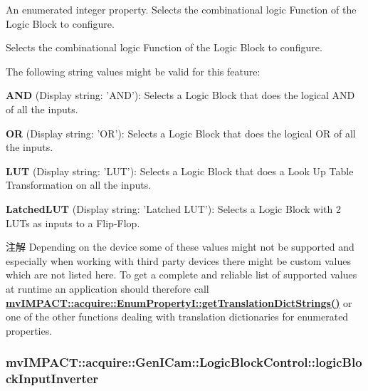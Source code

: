 An enumerated integer property. Selects the combinational logic Function of the Logic Block to configure. 

Selects the combinational logic Function of the Logic Block to configure.

The following string values might be valid for this feature\+:
\begin{DoxyItemize}
\item {\bfseries A\+N\+D} (Display string\+: 'A\+N\+D')\+: Selects a Logic Block that does the logical A\+N\+D of all the inputs.
\item {\bfseries O\+R} (Display string\+: 'O\+R')\+: Selects a Logic Block that does the logical O\+R of all the inputs.
\item {\bfseries L\+U\+T} (Display string\+: 'L\+U\+T')\+: Selects a Logic Block that does a Look Up Table Transformation on all the inputs.
\item {\bfseries Latched\+L\+U\+T} (Display string\+: 'Latched L\+U\+T')\+: Selects a Logic Block with 2 L\+U\+Ts as inputs to a Flip-\/\+Flop.
\end{DoxyItemize}

\begin{DoxyNote}{注解}
Depending on the device some of these values might not be supported and especially when working with third party devices there might be custom values which are not listed here. To get a complete and reliable list of supported values at runtime an application should therefore call {\bfseries \hyperlink{classmv_i_m_p_a_c_t_1_1acquire_1_1_enum_property_i_a0ba6ccbf5ee69784d5d0b537924d26b6}{mv\+I\+M\+P\+A\+C\+T\+::acquire\+::\+Enum\+Property\+I\+::get\+Translation\+Dict\+Strings()}} or one of the other functions dealing with translation dictionaries for enumerated properties. 
\end{DoxyNote}
\hypertarget{classmv_i_m_p_a_c_t_1_1acquire_1_1_gen_i_cam_1_1_logic_block_control_a251dfbb312a12faa9b8f628b97f46f45}{
\subsubsection[{logic\+Block\+Input\+Inverter}]{ mv\+I\+M\+P\+A\+C\+T\+::acquire\+::\+Gen\+I\+Cam\+::\+Logic\+Block\+Control\+::logic\+Block\+Input\+Inverter}}\label{classmv_i_m_p_a_c_t_1_1acquire_1_1_gen_i_cam_1_1_logic_block_control_a251dfbb312a12faa9b8f628b97f46f45}


